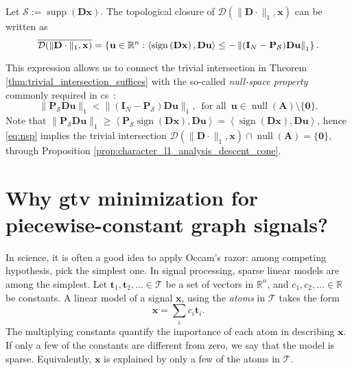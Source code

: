 \begin{proposition}\label{prop:character_l1_analysis_descent_cone}
    Let $\mathcal{S} := \operatorname{supp}\left ( \mathbf{Dx} \right )$. The topological closure of $\mathcal{D}(\| \mathbf{D} \cdot \|_1, \mathbf{x})$ can be written as
    \begin{equation}
        \mathop{\overline{\mathcal{D}(\| \mathbf{D} \cdot \|_1, \mathbf{x})}} = \left\{ \mathbf{u} \in \mathbb{R}^{n} : \left\langle \operatorname{sign} \left ( \mathbf{Dx} \right ), \mathbf{Du} \right\rangle \leq -\left\|(\mathbf{I}_N - \mathbf{P}_{\mathcal{S}}) \mathbf{Du}\right\|_1 \right\}.
    \end{equation}
\end{proposition}

This expression allows us to connect the trivial intersection in Theorem \ref{thm:trivial_intersection_suffices} with the so-called \emph{null-space property} commonly required in \acrlong{cs}~\cite[Ch. 4]{foucart2013}:
\begin{equation}
    \|\mathbf{P}_{\mathcal{S}} \mathbf{Du}\|_1 < \|(\mathbf{I}_N - \mathbf{P}_{\mathcal{S}}) \mathbf{Du}\|_1, \enspace \text{for all} \enspace \mathbf{u} \in \operatorname{null} \left ( \mathbf{A} \right ) \setminus \{\mathbf{0}\}.
    \label{eq:nsp}
\end{equation}
Note that $\| \mathbf{P}_{\mathcal{S}} \mathbf{Du}\|_1 \geq \left\langle \mathbf{P}_{\mathcal{S}}\operatorname{sign} \left ( \mathbf{Dx} \right ), \mathbf{Du} \right\rangle = \left\langle \operatorname{sign} \left ( \mathbf{Dx} \right ), \mathbf{Du} \right\rangle$, hence \eqref{eq:nsp} implies the trivial intersection $\mathcal{D}(\| \mathbf{D} \cdot \|_1, \mathbf{x}) \cap \operatorname{null} \left ( \mathbf{A} \right ) = \{\mathbf{0}\}$, through Proposition \ref{prop:character_l1_analysis_descent_cone}.


\section{Why \texorpdfstring{\acrshort{gtv}}{G-TV} minimization for piecewise-constant graph signals?}

In science, it is often a good idea to apply Occam's razor: among competing hypothesis, pick the simplest one. In signal processing, sparse linear models are among the simplest. Let $\mathbf{t}_1, \mathbf{t}_2, \dots \in \mathcal{T}$ be a set of vectors in $\mathbb{R}^{n}$, and $c_1, c_2, \dots \in \mathbb{R}$ be constants. A linear model of a signal $\mathbf{x}$, using the \emph{atoms} in $\mathcal{T}$ takes the form
\begin{equation}\label{eq:linear_model}
    \mathbf{x} = \sum_{i} c_i \mathbf{t}_i.
\end{equation}
The multiplying constants quantify the importance of each atom in describing $\mathbf{x}$. If only a few of the constants are different from zero, we say that the model is sparse. Equivalently, $\mathbf{x}$ is explained by only a few of the atoms in $\mathcal{T}$.

